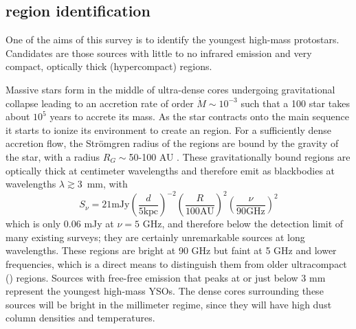 \documentclass[twocolumn]{aastex62}
\begin{document}


\subsection{\hchii region identification}
\label{sec:hiireg}
One of the aims of this survey is to identify the youngest high-mass
protostars.  Candidates are those sources with little to no infrared emission
and very compact, optically thick (hypercompact) \hii regions.

Massive stars form in the middle of ultra-dense cores undergoing gravitational
collapse leading to an accretion rate of order $\dot{M} \sim 10^{-3}$ \msun
\peryr such that a 100 \msun star takes about $10^5$ years to accrete its mass.
As the star contracts onto the main sequence it starts to ionize its
environment to create an \hchii region.  For a sufficiently dense accretion
flow, the Strömgren radius of the \hchii regions are bound by the gravity of
the star, with a radius $R_G \sim$50-100 AU
\citep{Keto2002a,Keto2003a,Keto2007a}.  These gravitationally bound \hchii
regions are optically thick at centimeter wavelengths and therefore emit as
blackbodies at wavelengths $\lambda\gtrsim$3~mm, with 
\begin{equation}
    S_\nu=21 \textrm{mJy} \left(\frac{d}{5
    \textrm{kpc}}\right)^{-2} \left(\frac{R}{100 \textrm{AU}}\right)^2 \left(\frac{\nu}{90 \textrm{GHz}}\right)^2
\end{equation}
which is only
0.06 mJy at $\nu=5$ GHz, and therefore below the detection limit of many
existing surveys; they are certainly unremarkable sources at long wavelengths.
These \hchii regions are bright at 90 GHz but faint at 5 GHz and lower
frequencies, which is a direct means to distinguish them from older
ultracompact (\uchii) regions.  Sources
with free-free emission that peaks at or just below 3 mm represent the youngest
high-mass YSOs.  The dense cores surrounding these sources will be bright
in the millimeter regime, since they will have high dust column densities and
temperatures.
\end{document}
